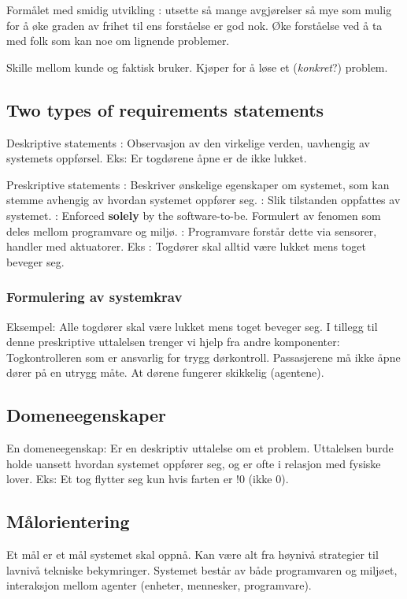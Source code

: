 Formålet med smidig utvikling : utsette så mange avgjørelser så mye som
mulig for å øke graden av frihet til ens forståelse er god nok. Øke
forståelse ved å ta med folk som kan noe om lignende problemer.

Skille mellom kunde og faktisk bruker. Kjøper for å løse et
(\emph{konkret}?) problem.

\subsection{Two types of requirements statements}

Deskriptive statements : Observasjon av den virkelige verden, uavhengig
av systemets oppførsel. Eks: Er togdørene åpne er de ikke lukket.

Preskriptive statements : Beskriver ønskelige egenskaper om systemet,
som kan stemme avhengig av hvordan systemet oppfører seg. : Slik
tilstanden oppfattes av systemet. : Enforced \textbf{solely} by the
software-to-be. Formulert av fenomen som deles mellom programvare og
miljø. : Programvare forstår dette via sensorer, handler med aktuatorer.
Eks : Togdører skal alltid være lukket mens toget beveger seg.

\subsubsection{Formulering av systemkrav}

Eksempel: Alle togdører skal være lukket mens toget beveger seg. I
tillegg til denne preskriptive uttalelsen trenger vi hjelp fra andre
komponenter: Togkontrolleren som er ansvarlig for trygg dørkontroll.
Passasjerene må ikke åpne dører på en utrygg måte. At dørene fungerer
skikkelig (agentene).

\subsection{Domeneegenskaper}

En domeneegenskap: Er en deskriptiv uttalelse om et problem. Uttalelsen
burde holde uansett hvordan systemet oppfører seg, og er ofte i relasjon
med fysiske lover. Eks: Et tog flytter seg kun hvis farten er !0 (ikke
0).

\subsection{Målorientering}

Et mål er et mål systemet skal oppnå. Kan være alt fra høynivå
strategier til lavnivå tekniske bekymringer. Systemet består av både
programvaren og miljøet, interaksjon mellom agenter (enheter, mennesker,
programvare).

